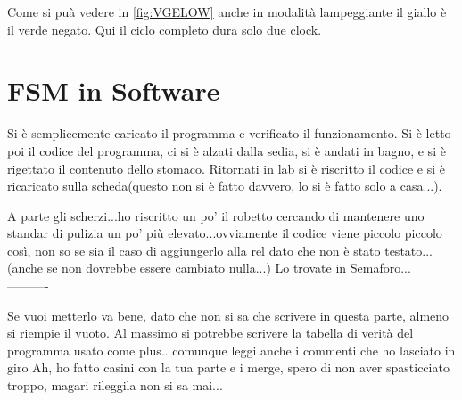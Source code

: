 \documentclass[a4paper,10pt]{article}
\begin{document}
Come si puà vedere in \cref{fig:VGELOW} anche in modalità lampeggiante il giallo è il verde negato. Qui il ciclo completo dura solo due clock.

\section{FSM in Software}

Si è semplicemente caricato il programma e verificato il funzionamento. Si è letto poi il codice del programma, ci si è alzati dalla sedia, si è andati in bagno, e si è rigettato il contenuto dello stomaco. Ritornati in lab si è riscritto il codice e si è ricaricato sulla scheda(questo non si è fatto davvero, lo si è fatto solo a casa...). 

A parte gli scherzi...ho riscritto un po' il robetto cercando di mantenere uno standar di pulizia un po' più elevato...ovviamente il codice viene piccolo piccolo così, non so se sia il caso di aggiungerlo alla rel dato che non è stato testato... (anche se non dovrebbe essere cambiato nulla...)
Lo trovate in Semaforo...
----------

Se vuoi metterlo va bene, dato che non si sa che scrivere in questa parte, almeno si riempie il vuoto. Al massimo si potrebbe scrivere la tabella di verità del programma usato come plus.. comunque leggi anche i commenti che ho lasciato in giro
Ah, ho fatto casini con la tua parte e i merge, spero di non aver spasticciato troppo, magari rileggila non si sa mai...
\end{document}

